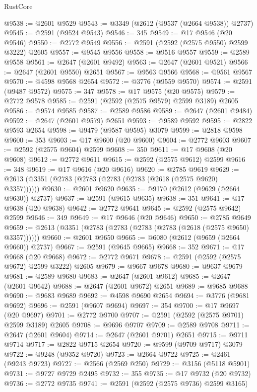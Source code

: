 \begin{lexlean}{RustCore}
\begin{coremodule}
@9538 := @2601 @9529
@9543 := @3349 (@2612 (@9537 (@2664 @9538)) @2737)
@9545 := @2591 (@9524 @9543)
@9546 := 345
@9549 := @17 @9546 (@20 @9546)
@9550 := @2772 @9549
@9556 := @2591 (@2592 (@2575 @9550) @2599 @3222) @2605
@9557 := @9545 @9556
@9558 := @9516 @9557
@9559 := @2589 @9558
@9561 := @2647 (@2601 @9492)
@9563 := @2647 (@2601 @9521)
@9566 := @2647 (@2601 @9550) @2651
@9567 := @9563 @9566
@9568 := @9561 @9567
@9570 := @4598 @9568 @2654
@9572 := @3776 (@9559 @9570)
@9574 := @2591 (@9487 @9572)
@9575 := 347
@9578 := @17 @9575 (@20 @9575)
@9579 := @2772 @9578
@9585 := @2591 (@2592 (@2575 @9579) @2599 @3189) @2605
@9586 := @9574 @9585
@9587 := @2589 @9586
@9589 := @2647 (@2601 @9484)
@9592 := @2647 (@2601 @9579) @2651
@9593 := @9589 @9592
@9595 := @2822 @9593 @2654
@9598 := @9479 (@9587 @9595) @3079
@9599 := @2818 @9598
@9600 := 353
@9603 := @17 @9600 (@20 @9600)
@9604 := @2772 @9603
@9607 := @2592 (@2575 @9604) @2599
@9608 := 350
@9611 := @17 @9608 (@20 @9608)
@9612 := @2772 @9611
@9615 := @2592 (@2575 @9612) @2599
@9616 := 348
@9619 := @17 @9616 (@20 @9616)
@9620 := @2785 @9619
@9629 := @2613 (@3351 (@2783 (@2783 (@2783 (@2783 (@2618 (@2575 @9620) @3357))))))
@9630 := @2601 @9620
@9635 := @9170 (@2612 (@9629 (@2664 @9630)) @2737)
@9637 := @2591 (@9615 @9635)
@9638 := 351
@9641 := @17 @9638 (@20 @9638)
@9642 := @2772 @9641
@9645 := @2592 (@2575 @9642) @2599
@9646 := 349
@9649 := @17 @9646 (@20 @9646)
@9650 := @2785 @9649
@9659 := @2613 (@3351 (@2783 (@2783 (@2783 (@2783 (@2618 (@2575 @9650) @3357))))))
@9660 := @2601 @9650
@9665 := @6080 (@2612 (@9659 (@2664 @9660)) @2737)
@9667 := @2591 (@9645 @9665)
@9668 := 352
@9671 := @17 @9668 (@20 @9668)
@9672 := @2772 @9671
@9678 := @2591 (@2592 (@2575 @9672) @2599 @3222) @2605
@9679 := @9667 @9678
@9680 := @9637 @9679
@9681 := @2589 @9680
@9683 := @2647 (@2601 @9612)
@9685 := @2647 (@2601 @9642)
@9688 := @2647 (@2601 @9672) @2651
@9689 := @9685 @9688
@9690 := @9683 @9689
@9692 := @4598 @9690 @2654
@9694 := @3776 (@9681 @9692)
@9696 := @2591 (@9607 @9694)
@9697 := 354
@9700 := @17 @9697 (@20 @9697)
@9701 := @2772 @9700
@9707 := @2591 (@2592 (@2575 @9701) @2599 @3189) @2605
@9708 := @9696 @9707
@9709 := @2589 @9708
@9711 := @2647 (@2601 @9604)
@9714 := @2647 (@2601 @9701) @2651
@9715 := @9711 @9714
@9717 := @2822 @9715 @2654
@9720 := @9599 (@9709 @9717) @3079
@9722 := @9248 (@9352 @9720)
@9723 := @2664 @9722
@9725 := @2461 (@9243 @9723)
@9727 := @2566 (@2569 @250)
@9729 := @3156 (@5118 @5901)
@9731 := @9727 @9729 @2495
@9732 := 355
@9735 := @17 @9732 (@20 @9732)
@9736 := @2772 @9735
@9741 := @2591 (@2592 (@2575 @9736) @2599 @3165)

\end{coremodule}
\end{lexlean}
